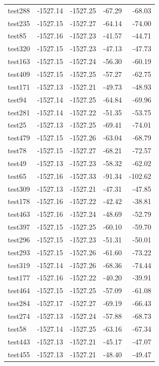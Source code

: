 \documentclass[journal=jacsat,manuscript=article]{achemso}
\begin{document}
\begin{table}[b!]
\begin{tabular}{lrrrr}
test288 &  -1527.14 &  -1527.25 &  -67.29 &  -68.03 \\
test235 &  -1527.15 &  -1527.27 &  -64.14 &  -74.00 \\
test85  &  -1527.16 &  -1527.23 &  -41.57 &  -44.71 \\
test320 &  -1527.15 &  -1527.23 &  -47.13 &  -47.73 \\
test163 &  -1527.15 &  -1527.24 &  -56.30 &  -60.19 \\
test409 &  -1527.15 &  -1527.25 &  -57.27 &  -62.75 \\
test171 &  -1527.13 &  -1527.21 &  -49.73 &  -48.93 \\
test94  &  -1527.14 &  -1527.25 &  -64.84 &  -69.96 \\
test281 &  -1527.14 &  -1527.22 &  -51.35 &  -53.75 \\
test25  &  -1527.13 &  -1527.25 &  -69.41 &  -74.01 \\
test479 &  -1527.15 &  -1527.26 &  -63.04 &  -68.79 \\
test78  &  -1527.15 &  -1527.27 &  -68.21 &  -72.57 \\
test49  &  -1527.13 &  -1527.23 &  -58.32 &  -62.02 \\
test65  &  -1527.16 &  -1527.33 &  -91.34 & -102.62 \\
test309 &  -1527.13 &  -1527.21 &  -47.31 &  -47.85 \\
test178 &  -1527.16 &  -1527.22 &  -42.42 &  -38.81 \\
test463 &  -1527.16 &  -1527.24 &  -48.69 &  -52.79 \\
test397 &  -1527.15 &  -1527.25 &  -60.10 &  -59.70 \\
test296 &  -1527.15 &  -1527.23 &  -51.31 &  -50.01 \\
test293 &  -1527.15 &  -1527.26 &  -61.60 &  -73.22 \\
test319 &  -1527.14 &  -1527.26 &  -68.36 &  -74.44 \\
test177 &  -1527.16 &  -1527.22 &  -40.20 &  -39.91 \\
test464 &  -1527.15 &  -1527.25 &  -57.09 &  -61.08 \\
test284 &  -1527.17 &  -1527.27 &  -69.19 &  -66.43 \\
test274 &  -1527.13 &  -1527.24 &  -57.88 &  -68.73 \\
test58  &  -1527.14 &  -1527.25 &  -63.16 &  -67.34 \\
test443 &  -1527.13 &  -1527.21 &  -45.17 &  -47.07 \\
test455 &  -1527.13 &  -1527.21 &  -48.40 &  -49.47 \\

\end{tabular}
\end{table}
\end{document}
